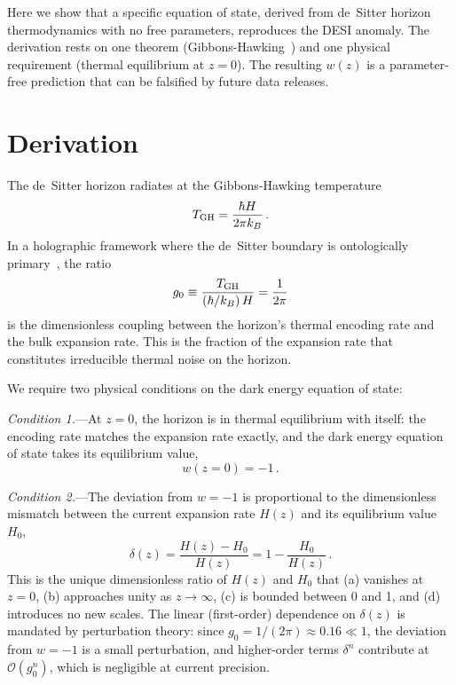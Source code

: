 \documentclass[aps,prl,twocolumn,showpacs,preprintnumbers,amsmath,amssymb,superscriptaddress]{revtex4-2}
\begin{document}
Here we show that a specific equation of state, derived from de~Sitter 
horizon thermodynamics with no free parameters, reproduces the DESI 
anomaly. The derivation rests on one theorem (Gibbons-Hawking~\cite{GH1977}) 
and one physical requirement (thermal equilibrium at $z=0$). The resulting 
$w(z)$ is a parameter-free prediction that can be falsified by future 
data releases.

\section{Derivation}

The de~Sitter horizon radiates at the Gibbons-Hawking 
temperature~\cite{GH1977}
\begin{equation}
T_{\rm GH} = \frac{\hbar H}{2\pi k_B}\,.
\label{eq:TGH}
\end{equation}
In a holographic framework where the de~Sitter boundary is ontologically 
primary~\cite{Bousso2002,Susskind1995}, the ratio
\begin{equation}
g_0 \equiv \frac{T_{\rm GH}}{(\hbar/k_B)\,H} = \frac{1}{2\pi}
\label{eq:g0}
\end{equation}
is the dimensionless coupling between the horizon's thermal encoding 
rate and the bulk expansion rate. This is the fraction of the expansion 
rate that constitutes irreducible thermal noise on the horizon.

We require two physical conditions on the dark energy equation of state:

\noindent\textit{Condition 1.}---At $z=0$, the horizon is in thermal 
equilibrium with itself: the encoding rate matches the expansion rate 
exactly, and the dark energy equation of state takes its equilibrium 
value,
\begin{equation}
w(z{=}0) = -1\,.
\label{eq:cond1}
\end{equation}

\noindent\textit{Condition 2.}---The deviation from $w=-1$ is 
proportional to the dimensionless mismatch between the current expansion 
rate $H(z)$ and its equilibrium value $H_0$,
\begin{equation}
\delta(z) = \frac{H(z) - H_0}{H(z)} = 1 - \frac{H_0}{H(z)}\,.
\label{eq:delta}
\end{equation}
This is the unique dimensionless ratio of $H(z)$ and $H_0$ that 
(a) vanishes at $z=0$, (b) approaches unity as $z \to \infty$, 
(c) is bounded between 0 and 1, and (d) introduces no new scales.
The linear (first-order) dependence on $\delta(z)$ is mandated by 
perturbation theory: since $g_0 = 1/(2\pi) \approx 0.16 \ll 1$, 
the deviation from $w=-1$ is a small perturbation, and higher-order 
terms $\delta^n$ contribute at $\mathcal{O}(g_0^n)$, which is 
negligible at current precision.
\end{document}
